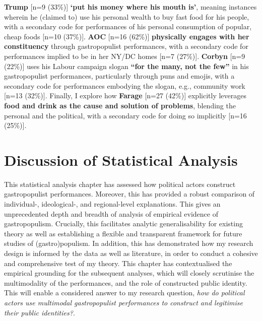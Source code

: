 \documentclass[a4paper, nobind]{templates/ociamthesis}
\begin{document}
\textbf{Trump} {[}n=9 (33\%){]} \textbf{`put his money where his mouth is'}, meaning instances wherein he (claimed to) use his personal wealth to buy fast food for his people, with a secondary code for performances of his personal consumption of popular, cheap foods {[}n=10 (37\%){]}. \textbf{AOC} {[}n=16 (62\%){]} \textbf{physically engages with her constituency} through gastropopulist performances, with a secondary code for performances implied to be in her NY/DC homes {[}n=7 (27\%){]}. \textbf{Corbyn} {[}n=9 (22\%){]} uses his Labour campaign slogan \textbf{``for the many, not the few''} in his gastropopulist performances, particularly through puns and emojis, with a secondary code for performances embodying the slogan, e.g., community work {[}n=13 (32\%){]}. Finally, I explore how \textbf{Farage} {[}n=27 (42\%){]} explicitly leverages \textbf{food and drink as the cause and solution of problems}, blending the personal and the political, with a secondary code for doing so implicitly {[}n=16 (25\%){]}.

\hypertarget{discussion-of-statistical-analysis}{%
\section*{Discussion of Statistical Analysis}\label{discussion-of-statistical-analysis}}

This statistical analysis chapter has assessed how political actors construct gastropopulist performances. Moreover, this has provided a robust comparison of individual-, ideological-, and regional-level explanations. This gives an unprecedented depth and breadth of analysis of empirical evidence of gastropopulism. Crucially, this facilitates analytic generalisability for existing theory as well as establishing a flexible and transparent framework for future studies of (gastro)populism. In addition, this has demonstrated how my research design is informed by the data as well as literature, in order to conduct a cohesive and comprehensive test of my theory. This chapter has contextualised the empirical grounding for the subsequent analyses, which will closely scrutinise the multimodality of the performances, and the role of constructed public identity. This will enable a considered answer to my research question, \emph{how do political actors use multimodal gastropopulist performances to construct and legitimise their public identities?}.

\end{document}
